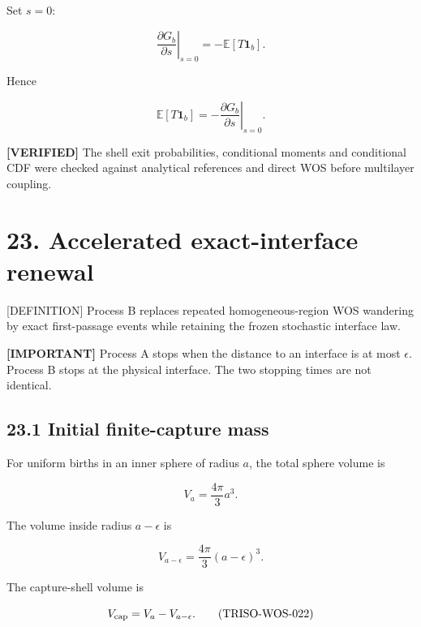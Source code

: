 \documentclass[11pt,a4paper]{article}
\begin{document}
Set $s=0$:

\begin{equation}
\left.\frac{\partial G_b}{\partial s}\right|_{s=0}
=
-\mathbb E[T\mathbf1_b].
\tag{TRISO-FPT-064}
\label{eq:triso-fpt-064}
\end{equation}

Hence

\begin{equation}
\boxed{
\mathbb E[T\mathbf1_b]
=
-
\left.\frac{\partial G_b}{\partial s}\right|_{s=0}.
}
\tag{TRISO-FPT-065}
\label{eq:triso-fpt-065}
\end{equation}

\textbf{[VERIFIED]} The shell exit probabilities, conditional moments and conditional CDF were checked against analytical references and direct WOS before multilayer coupling.


\section*{23. Accelerated exact-interface renewal}

[DEFINITION] Process B replaces repeated homogeneous-region WOS wandering by exact first-passage events while retaining the frozen stochastic interface law.

\textbf{[IMPORTANT]} Process A stops when the distance to an interface is at most $\epsilon$. Process B stops at the physical interface. The two stopping times are not identical.

\subsection*{23.1 Initial finite-capture mass}

For uniform births in an inner sphere of radius $a$, the total sphere volume is

\begin{equation}
V_a=\frac{4\pi}{3}a^3.
\tag{TRISO-WOS-020}
\label{eq:triso-wos-020}
\end{equation}

The volume inside radius $a-\epsilon$ is

\begin{equation}
V_{a-\epsilon}
=
\frac{4\pi}{3}(a-\epsilon)^3.
\tag{TRISO-WOS-021}
\label{eq:triso-wos-021}
\end{equation}

The capture-shell volume is

\begin{equation}
V_{\rm cap}
=
V_a-V_{a-\epsilon}.
\tag{TRISO-WOS-022}
\label{eq:triso-wos-022}
\end{equation}
\end{document}
